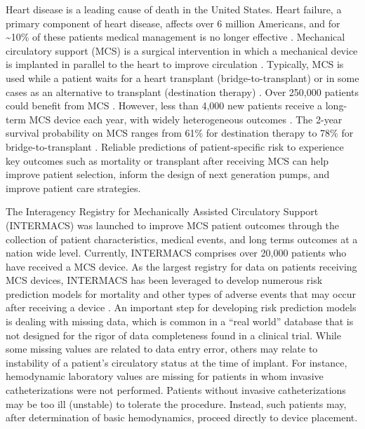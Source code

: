 \documentclass{article}
\begin{document}
\label{sec:introduction}

\linenumbers
\doublespacing

Heart disease is a leading cause of death in the United States. Heart
failure, a primary component of heart disease, affects over 6 million
Americans, and for \textasciitilde10\% of these patients medical
management is no longer effective
\cite{benjamin2017heart,national2017health}. Mechanical circulatory
support (MCS) is a surgical intervention in which a mechanical device is
implanted in parallel to the heart to improve circulation
\cite{patel2014contemporary}. Typically, MCS is used while a patient
waits for a heart transplant (bridge-to-transplant) or in some cases as
an alternative to transplant (destination therapy)
\cite{slaughter2009advanced}. Over 250,000 patients could benefit from
MCS \cite{miller2011left}. However, less than 4,000 new patients receive
a long-term MCS device each year, with widely heterogeneous outcomes
\cite{stewart2011keeping}. The 2-year survival probability on MCS ranges
from 61\% for destination therapy to 78\% for bridge-to-transplant
\cite{patel2014contemporary}. Reliable predictions of patient-specific
risk to experience key outcomes such as mortality or transplant after
receiving MCS can help improve patient selection, inform the design of
next generation pumps, and improve patient care strategies.

The Interagency Registry for Mechanically Assisted Circulatory Support
(INTERMACS) was launched to improve MCS patient outcomes through the
collection of patient characteristics, medical events, and long terms
outcomes at a nation wide level. Currently, INTERMACS comprises over
20,000 patients who have received a MCS device. As the largest registry
for data on patients receiving MCS devices, INTERMACS has been leveraged
to develop numerous risk prediction models for mortality and other types
of adverse events that may occur after receiving a device
\cite{hsich2012should, cotts2014predictors, eckman2011survival, kirklin2017eighth, kormos2019society, Adamo950}.
An important step for developing risk prediction models is dealing with
missing data, which is common in a ``real world'' database that is not
designed for the rigor of data completeness found in a clinical trial.
While some missing values are related to data entry error, others may
relate to instability of a patient's circulatory status at the time of
implant. For instance, hemodynamic laboratory values are missing for
patients in whom invasive catheterizations were not performed. Patients
without invasive catheterizations may be too ill (unstable) to tolerate
the procedure. Instead, such patients may, after determination of basic
hemodynamics, proceed directly to device placement.
\end{document}
